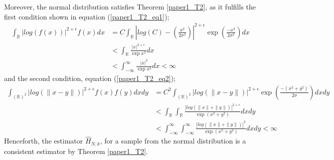 \documentclass{article}
\begin{document}
Moreover, the normal distribution satisfies Theorem \ref{paper1_T2}, as it fulfills the first condition shown in equation (\ref{paper1_T2_eq1});
\begin{align} \nonumber
\int_{\mathbb{R}} | log(f(x))|^{2 + \epsilon} f(x) dx  &= C \int_{\mathbb{R}} \left| log \left( C \right) -  \left( \frac{x^2}{2\sigma^2} \right) \right|^{2 + \epsilon} \exp{ \left( \frac{-x^2}{2\sigma^2} \right)} dx \\ \nonumber
&< \int_{\mathbb{R}} \frac{|x|^{2 + \epsilon}}{ \exp{x^2}} dx \\ \nonumber
&< \int_{-\infty}^{\infty} \frac{|x|^2}{ \exp{x^2}} dx < \infty \nonumber
\end{align}
and the second condition, equation (\ref{paper1_T2_eq2});
\begin{align} \nonumber
\int_{(\mathbb{R})^2} | log(\|x-y\|)|^{2+ \epsilon} f(x) f(y) dx dy  &= C^2 \int_{(\mathbb{R})^2} | log(\|x-y\|)|^{2+ \epsilon} \exp{\left(\frac{-(x^2 + y^2)}{2 \sigma}\right)} dx dy \\ \nonumber
&< \int_{\mathbb{R}} \int_{\mathbb{R}} \frac{| log(\|x\| + \|y\|)|^{2+ \epsilon}}{\exp{(x^2 + y^2)}} dx dy \\ \nonumber
&< \int_{-\infty}^{\infty} \int_{-\infty}^{\infty} \frac{| log(\|x\| + \|y\|)|^2}{\exp{(x^2 + y^2)}} dx dy < \infty  \nonumber
\end{align}
Henceforth, the estimator $\hat{H}_{N,k}$, for a sample from the normal distribution is a consistent estimator by Theorem \ref{paper1_T2}. 
\end{document}
